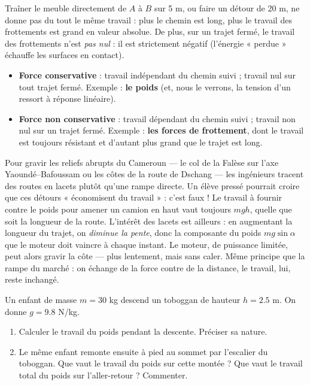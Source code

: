 \documentclass[11pt]{article}
\begin{document}
Traîner le meuble directement de $A$ à $B$ sur \num{5} m, ou faire un détour de \num{20} m, ne donne pas du tout le même travail : plus le chemin est long, plus le travail des frottements est grand en valeur absolue. De plus, sur un trajet fermé, le travail des frottements n'est \emph{pas nul} : il est strictement négatif (l'énergie « perdue » échauffe les surfaces en contact).

\begin{aretenir}
\begin{itemize}
\item \textbf{Force conservative} : travail indépendant du chemin suivi ; travail nul sur tout trajet fermé. Exemple : \textbf{le poids} (et, nous le verrons, la tension d'un ressort à réponse linéaire).
\item \textbf{Force non conservative} : travail dépendant du chemin suivi ; travail non nul sur un trajet fermé. Exemple : \textbf{les forces de frottement}, dont le travail est toujours résistant et d'autant plus grand que le trajet est long.
\end{itemize}
\end{aretenir}

\begin{savaistu}
Pour gravir les reliefs abrupts du Cameroun — le col de la Falèse sur l'axe Yaoundé--Bafoussam ou les côtes de la route de Dschang — les ingénieurs tracent des routes en lacets plutôt qu'une rampe directe. Un élève pressé pourrait croire que ces détours « économisent du travail » : c'est faux ! Le travail à fournir contre le poids pour amener un camion en haut vaut toujours $mgh$, quelle que soit la longueur de la route. L'intérêt des lacets est ailleurs : en augmentant la longueur du trajet, on \emph{diminue la pente}, donc la composante du poids $mg\sin\alpha$ que le moteur doit vaincre à chaque instant. Le moteur, de puissance limitée, peut alors gravir la côte — plus lentement, mais sans caler. Même principe que la rampe du marché : on échange de la force contre de la distance, le travail, lui, reste inchangé.
\end{savaistu}

\begin{exercice}
Un enfant de masse $m = \num{30}$ kg descend un toboggan de hauteur $h = \num{2,5}$ m. On donne $g = \num{9,8}$ N/kg.
\begin{enumerate}
\item Calculer le travail du poids pendant la descente. Préciser sa nature.
\item Le même enfant remonte ensuite à pied au sommet par l'escalier du toboggan. Que vaut le travail du poids sur cette montée ? Que vaut le travail total du poids sur l'aller-retour ? Commenter.
\end{enumerate}
\end{exercice}
\end{document}
